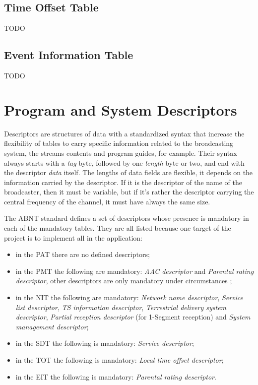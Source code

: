 \documentclass[
	12pt,				%
	openright,			%
	twoside,			%
	a4paper,			%
	brazil,
	french,				%
	english
	]{abntex2}
\begin{document}
\subsection{Time Offset Table}
\label{TOT}
TODO

\subsection{Event Information Table}
\label{EIT}
TODO

\section{Program and System Descriptors}
\label{descriptors}
Descriptors are structures of data with a standardized syntax that increase the flexibility of tables to carry specific information related to the broadcasting system, the streams contents and program guides, for example. Their syntax always starts with a \textit{tag} byte, followed by one \textit{length} byte or two, and end with the descriptor \textit{data} itself. The lengths of data fields are flexible, it depends on the information carried by the descriptor. If it is the descriptor of the name of the broadcaster, then it must be variable, but if it's rather the descriptor carrying the central frequency of the channel, it must have always the same size.

The ABNT standard defines a set of descriptors whose presence is mandatory in each of the mandatory tables. They are all listed because one target of the project is to implement all in the application:

\begin{itemize}

\item in the PAT there are no defined descriptors;
\item in the PMT the following are mandatory: \textit{AAC descriptor} and \textit{Parental rating descriptor}, other descriptors are only mandatory under circumstances ;
\item in the NIT the following are mandatory: \textit{Network name descriptor}, \textit{Service list descriptor}, \textit{TS information descriptor}, \textit{Terrestrial delivery system descriptor}, \textit{Partial reception descriptor} (for 1-Segment reception) and \textit{System management descriptor};
\item in the SDT the following is mandatory: \textit{Service descriptor};
\item in the TOT the following is mandatory: \textit{Local time offset descriptor};
\item in the EIT the following is mandatory: \textit{Parental rating descriptor}.
\end{itemize}
\end{document}
